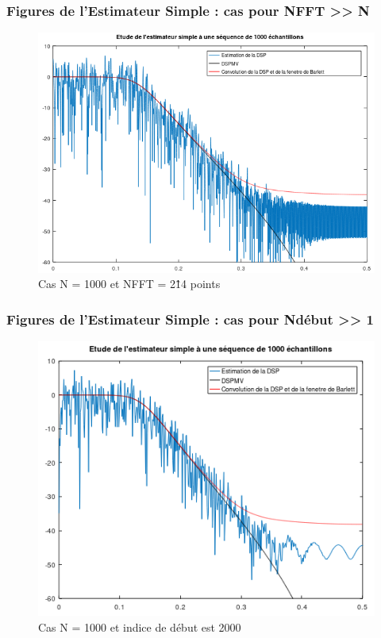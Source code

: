 \documentclass{article}
\begin{document}
\subsubsection{Figures de l'Estimateur Simple : cas pour  NFFT >> N}
\begin{figure}[h]
\centerline{\includegraphics[width=1\textwidth]{images/casESN1000FFT214.png}}
\caption{Cas N = 1000 et NFFT = 2\^14 points}
\end{figure}
\newpage
\subsubsection{Figures de l'Estimateur Simple : cas pour Ndébut >> 1}
\begin{figure}[h]
\centerline{\includegraphics[width=1\textwidth]{images/casESN1000PD2000.PNG}}
\caption{Cas N = 1000 et indice de début est 2000}
\end{figure}
\newpage
\end{document}
